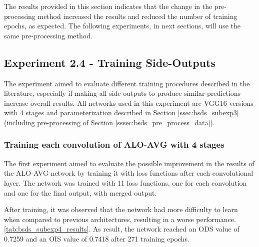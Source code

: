 The results provided in this section indicates that the change in the pre-processing method increased the results and reduced the number of training epochs, as expected.
The following experiments, in next sections, will use the same pre-processing method.
  
\subsection{Experiment 2.4 - Training Side-Outputs}
\label{ssec:bsds_subexp4}

The experiment aimed to evaluate different training procedures described in the literature, especially if making all side-outputs to produce similar predictions increase overall results.
All networks used in this experiment are VGG16 versions with 4 stages and parameterization described in Section \ref{ssec:bsds_subexp3} (including  pre-processing of Section \ref{sssec:bsds_pre_process_data}).

\subsubsection{Training each convolution of ALO-AVG with 4 stages}
\label{sssec:train_conv_alo_avg}

The first experiment aimed to evaluate the possible improvement in the results of the ALO-AVG network by training it with loss functions after each convolutional layer.
The network was trained with 11 loss functions, one for each convolution and one for the final output, with merged output.


After training, it was observed that the network had more difficulty to learn when compared to previous architectures, resulting in a worse performance. \ref{tab:bsds_subexp4_results}.
As result, the network reached an ODS value of 0.7259 and an OIS value of 0.7418 after 271 training epochs.

